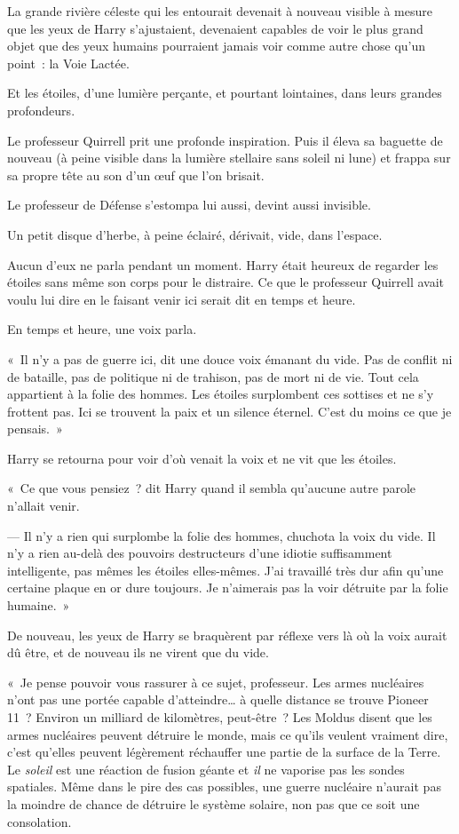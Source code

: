 La grande rivière céleste qui les entourait devenait à nouveau visible à mesure que les yeux de Harry s'ajustaient, devenaient capables de voir le plus grand objet que des yeux humains pourraient jamais voir comme autre chose qu'un point~: la Voie Lactée.

Et les étoiles, d'une lumière perçante, et pourtant lointaines, dans leurs grandes profondeurs.

Le professeur Quirrell prit une profonde inspiration.
Puis il éleva sa baguette de nouveau (à peine visible dans la lumière stellaire sans soleil ni lune) et frappa sur sa propre tête au son d'un œuf que l'on brisait.

Le professeur de Défense s'estompa lui aussi, devint aussi invisible.

Un petit disque d'herbe, à peine éclairé, dérivait, vide, dans l'espace.

Aucun d'eux ne parla pendant un moment.
Harry était heureux de regarder les étoiles sans même son corps pour le distraire.
Ce que le professeur Quirrell avait voulu lui dire en le faisant venir ici serait dit en temps et heure.

En temps et heure, une voix parla.

«~Il n'y a pas de guerre ici, dit une douce voix émanant du vide.
Pas de conflit ni de bataille, pas de politique ni de trahison, pas de mort ni de vie.
Tout cela appartient à la folie des hommes.
Les étoiles surplombent ces sottises et ne s'y frottent pas.
Ici se trouvent la paix et un silence éternel.
C'est du moins ce que je pensais.~»

Harry se retourna pour voir d'où venait la voix et ne vit que les étoiles.

«~Ce que vous pensiez~? dit Harry quand il sembla qu'aucune autre parole n'allait venir.

--- Il n'y a rien qui surplombe la folie des hommes, chuchota la voix du vide.
Il n'y a rien au-delà des pouvoirs destructeurs d'une idiotie suffisamment intelligente, pas mêmes les étoiles elles-mêmes.
J'ai travaillé très dur afin qu'une certaine plaque en or dure toujours.
Je n'aimerais pas la voir détruite par la folie humaine.~»

De nouveau, les yeux de Harry se braquèrent par réflexe vers là où la voix aurait dû être, et de nouveau ils ne virent que du vide.

«~Je pense pouvoir vous rassurer à ce sujet, professeur.
Les armes nucléaires n'ont pas une portée capable d'atteindre… à quelle distance se trouve Pioneer 11~?
Environ un milliard de kilomètres, peut-être~?
Les Moldus disent que les armes nucléaires peuvent détruire le monde, mais ce qu'ils veulent vraiment dire, c'est qu'elles peuvent légèrement réchauffer une partie de la surface de la Terre.
Le \emph{soleil} est une réaction de fusion géante et \emph{il} ne vaporise pas les sondes spatiales.
Même dans le pire des cas possibles, une guerre nucléaire n'aurait pas la moindre de chance de détruire le système solaire, non pas que ce soit une consolation.

